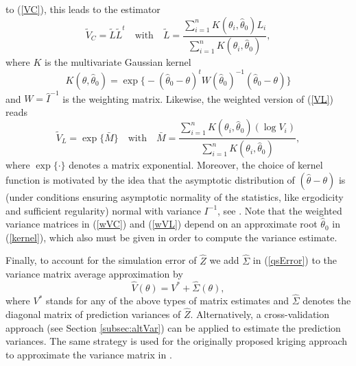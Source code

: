 \documentclass[article, nojss]{jss}
\numberwithin{equation}{section}			%
\begin{document}
to (\ref{VC}), this leads to the estimator
\begin{equation}\label{wVC}
 \tilde{V}_C=\tilde{L}\tilde{L}^t\quad \textrm{with}\quad \tilde{L} = \frac{\sum_{i=1}^n
 K(\theta_i,\hat{\theta}_0) L_i}{\sum_{i=1}^n K(\theta_i,\hat{\theta}_0)},
\end{equation}
where $K$ is the multivariate Gaussian kernel
\begin{equation}\label{kernel}
  K(\theta,\hat{\theta}_0) = \exp\bigg\{ -(\hat{\theta}_0-\theta)^t
  W(\hat{\theta}_0)^{-1}(\hat{\theta}_0-\theta)\bigg\}
\end{equation} 
and $W=\hat{I}^{-1}$ is the weighting matrix.
Likewise, the weighted version of (\ref{VL}) reads
\begin{equation}\label{wVL}
 \tilde{V}_L=\exp\{\bar{M}\}\quad \textrm{with}\quad \bar{M} = \frac{\sum_{i=1}^n
 K(\theta_i,\hat{\theta}_0) (\log V_i)}{\sum_{i=1}^n K(\theta_i,\hat{\theta}_0)},
\end{equation}
where $\exp\{\cdot\}$ denotes a matrix exponential. Moreover, the choice of
kernel function is motivated by the idea that the asymptotic distribution of $(\hat{\theta}-\theta)$
is (under conditions ensuring asymptotic normality of the statistics, like ergodicity and sufficient
regularity) normal with variance $I^{-1}$, see \citet[sect.~4.3]{ref:Heyde1997}.
Note that the weighted variance matrices in (\ref{wVC}) and (\ref{wVL}) depend on an approximate root
$\hat{\theta}_0$ in (\ref{kernel}), which also must be given in order to compute the variance estimate.\par
%
Finally, to account for the simulation error of $\hat{Z}$ we add $\hat{\Sigma}$
in (\ref{qsError}) to the variance matrix average approximation by
\begin{equation}\label{modVar}
  \hat{V}(\theta) = V^* + \hat{\Sigma}(\theta),  
\end{equation}
where $V^*$ stands for any of the above types of matrix estimates
and $\hat{\Sigma}$ denotes the diagonal matrix of prediction variances of
$\hat{Z}$. Alternatively, a cross-validation approach (see Section
\ref{subsec:altVar}) can be applied to estimate the prediction variances. The same
strategy is used for the originally proposed kriging approach to approximate the
variance matrix in \cite{Baaske2014}.
%
\end{document}
